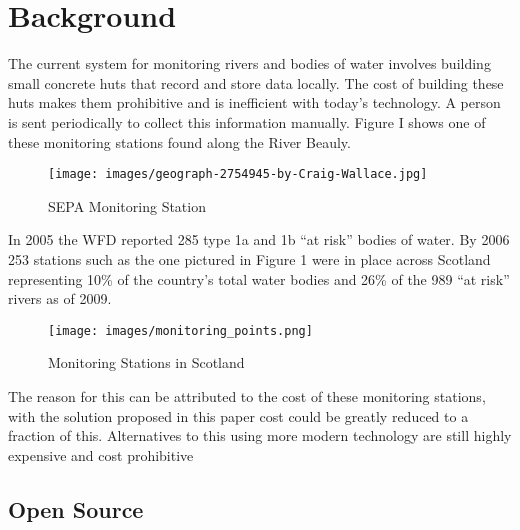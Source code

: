 \section{Background}
The current system for monitoring rivers and bodies of water involves building small concrete huts that record and store data locally. The cost of building these huts makes them prohibitive and is inefficient with today's technology. A person is sent periodically to collect this information manually. Figure I shows one of these monitoring stations found along the River Beauly. 
\begin{figure}[H]
	\centering
	\texttt{[image: images/geograph-2754945-by-Craig-Wallace.jpg]}
	\caption{ SEPA Monitoring Station \citep{Wallace2012}}
	\label{fig:monStation}
\end{figure}
In 2005 the WFD reported 285 type 1a and 1b “at risk” bodies of water. \citep{SEPA2007} By 2006  253 stations such as the one pictured in Figure 1 were in place across Scotland representing 10\% of the country’s total water bodies and 26\% of the 989  “at risk” rivers as of 2009. \citep{SEPA2009}
\begin{figure}[H]
	\centering
	\texttt{[image: images/monitoring\_points.png]}
	\caption{ Monitoring Stations in Scotland \citep{SEPA2006}}
	\label{fig:monStations}
\end{figure}
The reason for this can be attributed to the cost of these monitoring stations, with the solution proposed in this paper cost could be greatly reduced to a fraction of this. \citep{SEPA2016} Alternatives to this using more modern technology are still highly expensive and cost prohibitive \citep{TheIoTMarketplace2015}

\subsection{Open Source}

